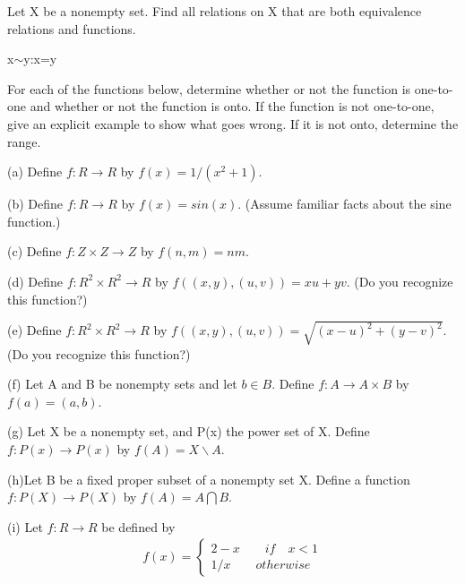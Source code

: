\documentclass[11pt, a4paper, UTF8]{ctexart}
\begin{document}
\begin{problem}[UD:13.13]
Let X be a nonempty set. Find all relations on X that are both equivalence relations and functions.
\end{problem}
\begin{solution}
x$\sim$y:x=y\\

\end{solution}


\begin{problem}[UD:14.8]
For each of the functions below, determine whether or not the function is one-to-one and whether or not the function is onto. If the function is not one-to-one, give an explicit example to show what goes wrong. If it is not onto, determine the range.

(a) Define \(f:R \rightarrow R\) by \(f(x) = 1 / (x^{2} +1)\).

(b) Define \(f:R \rightarrow R\) by \(f(x) = sin(x)\). (Assume familiar facts about the sine function.)

(c) Define \(f:Z \times Z \rightarrow Z\) by \(f(n,m) = nm\).

(d) Define \(f:R^{2} \times R^{2} \rightarrow R\) by \(f((x,y),(u,v)) = xu + yv\). (Do you recognize this function?)

(e) Define \(f:R^{2} \times R^{2} \rightarrow R\) by \(f((x,y),(u,v)) = \sqrt{(x-u)^{2} + (y-v)^{2}}\). (Do you recognize this function?)

(f) Let A and B be nonempty sets and let \(b \in B\). Define \(f:A \rightarrow A \times B\) by \(f(a) = (a,b)\).

(g) Let X be a nonempty set, and P(x) the power set of X. Define \(f:P(x) \rightarrow P(x)\) by \(f(A) = X \backslash A\).

(h)Let B be a fixed proper subset of a nonempty set X. Define a function \(f:P(X) \rightarrow P(X)\) by \(f(A) = A \bigcap B\).

(i) Let \(f:R \rightarrow R\) be defined by
\begin{align}
f(x) = 
\begin{cases}
2 - x \qquad if \quad x < 1\\
1/x \qquad otherwise
\end{cases}
\end{align}
\end{problem}
\end{document}
